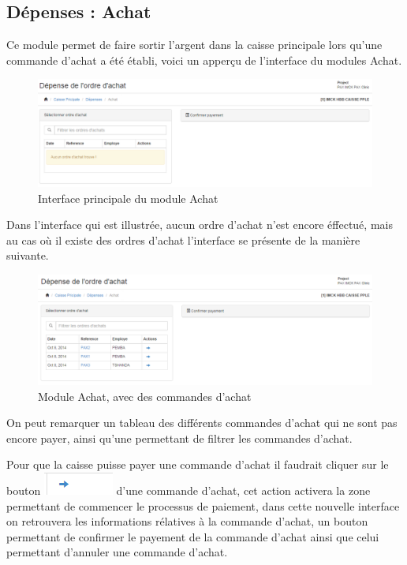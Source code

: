 \documentclass[12pt,a4paper]{report}
\begin{document}
\subsection{Dépenses : Achat}
Ce module permet de faire sortir l'argent dans la caisse principale lors qu'une commande d'achat a été établi, voici un apperçu de l'interface du modules Achat.

\begin{figure}[h]
\begin{center}
\includegraphics[width=14cm]{pic/Achat.png}
\end{center}
\caption{Interface principale du module Achat}
\label{Interface principale du module Achat}
\end{figure}

Dans l'interface qui est illustrée, aucun ordre d'achat n'est encore éffectué, mais au cas où il existe des ordres d'achat l'interface se présente de la manière suivante.

\begin{figure}[h]
\begin{center}
\includegraphics[width=14cm]{pic/Achat2.png}
\end{center}
\caption{Module Achat, avec des commandes d'achat}
\label{Module Achat, avec des commandes d'achat}
\end{figure}

On peut remarquer un tableau des différents commandes d'achat qui ne sont pas encore payer, ainsi qu'une permettant de filtrer les commandes d'achat. 

\newpage
Pour que la caisse puisse payer une commande d'achat il faudrait cliquer sur le bouton \includegraphics[scale=0.7]{pic/SelectedPOrder.png} d'une commande d'achat, cet action activera la zone permettant de commencer le processus de paiement, dans cette nouvelle interface on retrouvera les informations rélatives à la commande d'achat, un bouton permettant de confirmer le payement de la commande d'achat ainsi que celui permettant d'annuler une commande d'achat.
\end{document}
